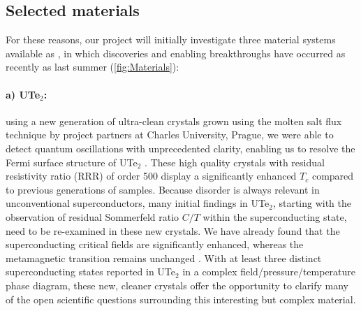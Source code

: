   \subsection*{Selected materials}
  \noindent
  For these reasons, our project will initially investigate three material systems available as , in which discoveries and enabling breakthroughs %
  have occurred as recently as last summer (\autoref{fig:Materials}):
  
  \paragraph {a) UTe$_2$:} 
  using a new generation of ultra-clean crystals grown using the molten salt flux technique by project partners at Charles University, Prague, we were able to detect quantum oscillations with unprecedented clarity, enabling us to resolve the Fermi surface structure of UTe$_2$ \cite{eaton23}. These high quality crystals with residual resistivity ratio (RRR) of order 500 display a significantly enhanced $T_c$ compared to previous generations of samples. Because disorder is always relevant in unconventional superconductors, many initial findings in UTe$_2$, starting with the observation of residual Sommerfeld ratio $C/T$ within the superconducting state, need to be re-examined in these new crystals. We have already found that the superconducting critical fields are significantly enhanced, whereas the metamagnetic transition remains unchanged \cite{wu23}. With at least three distinct superconducting states reported in UTe$_2$ in a complex field/pressure/temperature phase diagram, these new, cleaner crystals offer the opportunity to clarify many of the open scientific questions surrounding this interesting but complex material.
  
